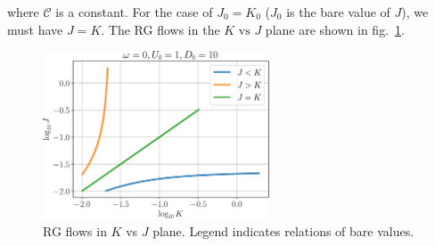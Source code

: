 \documentclass[twoside,11pt]{report}
\numberwithin{equation}{section}
\begin{document}
where \(\mathcal{C}\) is a constant. For the case of \(J_0 = K_0\) (\(J_0\) is the bare value of \(J\)), we must have \(J=K\). The RG flows in the \(K \text{ vs } J\) plane are shown in fig.~\ref{JvsK}.
\begin{figure}[htpb]
	\centering
	\includegraphics[width=0.6\textwidth]{../figures/JvsK.pdf}
	\caption{RG flows in \(K\) vs \(J\) plane. Legend indicates relations of bare values.}
	\label{JvsK}
\end{figure}
\end{document}
